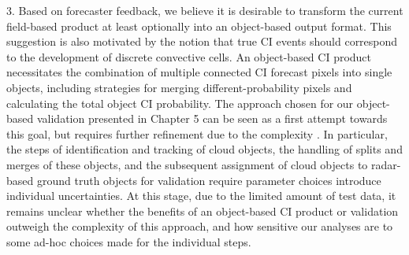 3. Based on forecaster feedback, we believe it is desirable to transform the current field-based  product at least optionally into an object-based output format. This suggestion is also motivated by the notion that true CI events should correspond to the development of discrete convective cells. An object-based CI product necessitates the combination of multiple connected CI forecast pixels into single objects, including strategies for merging different-probability pixels and calculating the total object CI probability. The approach chosen for our object-based validation presented in Chapter 5 can be seen as a first attempt towards this goal, but requires further refinement due to the complexity . In particular, the steps of identification and tracking of cloud objects, the handling of splits and merges of these objects, and the subsequent assignment of cloud objects to radar-based ground truth objects for validation require parameter choices introduce individual uncertainties. At this stage, due to the limited amount of test data, it remains unclear whether the benefits of an object-based CI product or validation outweigh the complexity of this approach, and how sensitive our analyses are to some ad-hoc choices made for the individual steps. 
